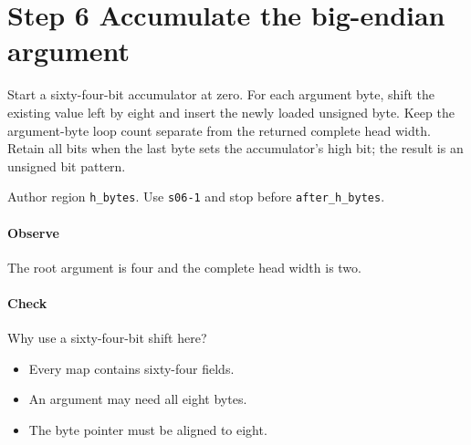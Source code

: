 \section{Step 6 Accumulate the big-endian argument}\label{cbor-s06}
Start a sixty-four-bit accumulator at zero. For each argument byte, shift the existing value left by eight and insert the newly loaded unsigned byte. Keep the argument-byte loop count separate from the returned complete head width. Retain all bits when the last byte sets the accumulator's high bit; the result is an unsigned bit pattern.

Author region \texttt{h\_bytes}. Use \texttt{s06-1} and stop before \texttt{after\_h\_bytes}.

\paragraph{Observe} The root argument is four and the complete head width is two.

\paragraph{Check} Why use a sixty-four-bit shift here?
\begin{itemize}
\item[A.] Every map contains sixty-four fields.
\item[B.] An argument may need all eight bytes.
\item[C.] The byte pointer must be aligned to eight.
\end{itemize}
